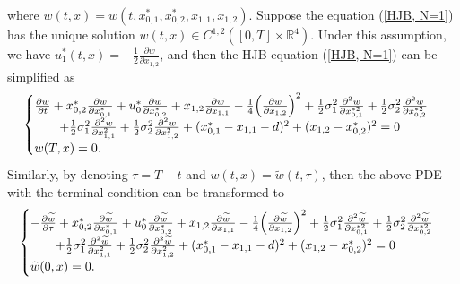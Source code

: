 \documentclass{article}
\begin{document}
where $w(t, x) = w(t, x_{0, 1}^{*}, x_{0, 2}^{*}, x_{1, 1}, x_{1, 2})$. Suppose the equation (\ref{HJB, N=1}) has the unique solution $w(t,x) \in C^{1,2}([0, T] \times \mathbb{R}^{4})$. Under this assumption, we have $u_{1}^{*}(t, x) = - \frac{1}{2} \frac{\partial w}{\partial x_{1, 2}}$, and then the HJB equation (\ref{HJB, N=1}) can be simplified as
\begin{equation*}
    \begin{cases}
    \frac{\partial w}{\partial t} + x_{0,2}^{*} \frac{\partial w}{\partial x_{0, 1}^{*}} + u_{0}^{*} \frac{\partial w}{\partial x_{0, 2}^{*}} + x_{1,2} \frac{\partial w}{\partial x_{1, 1}} - \frac{1}{4} \Big{(}\frac{\partial w}{\partial x_{1, 2}} \Big{)}^{2} + \frac{1}{2} \sigma_{1}^{2} \frac{\partial^{2} w}{\partial x_{0, 1}^{* 2}} + \frac{1}{2} \sigma_{2}^{2} \frac{\partial^{2} w}{\partial x_{0, 2}^{* 2}}  \\
   \qquad + \frac{1}{2} \sigma_{1}^{2} \frac{\partial^{2} w}{\partial x_{1, 1}^{2}} + \frac{1}{2} \sigma_{2}^{2} \frac{\partial^{2} w}{\partial x_{1, 2}^{2}} + (x_{0, 1}^{*} - x_{1, 1} - d)^{2} + (x_{1, 2} - x_{0, 2}^{*})^{2}  = 0  \\
   w(T, x) = 0.
   \end{cases}
\end{equation*}
Similarly, by denoting $\tau = T-t$ and $w(t,x) = \widetilde{w}(t, \tau)$, then the above PDE with the terminal condition can be transformed to
\begin{equation*}
    \begin{cases}
    - \frac{\partial \widetilde{w}}{\partial \tau} + x_{0,2}^{*} \frac{\partial \widetilde{w}}{\partial x_{0, 1}^{*}} + u_{0}^{*} \frac{\partial \widetilde{w}}{\partial x_{0, 2}^{*}} + x_{1,2} \frac{\partial \widetilde{w}}{\partial x_{1, 1}} - \frac{1}{4} \Big{(}\frac{\partial \widetilde{w}}{\partial x_{1, 2}} \Big{)}^{2} + \frac{1}{2} \sigma_{1}^{2} \frac{\partial^{2} \widetilde{w}}{\partial x_{0, 1}^{* 2}} + \frac{1}{2} \sigma_{2}^{2} \frac{\partial^{2} \widetilde{w}}{\partial x_{0, 2}^{* 2}}  \\
   \qquad + \frac{1}{2} \sigma_{1}^{2} \frac{\partial^{2} \widetilde{w}}{\partial x_{1, 1}^{2}} + \frac{1}{2} \sigma_{2}^{2} \frac{\partial^{2} \widetilde{w}}{\partial x_{1, 2}^{2}} + (x_{0, 1}^{*} - x_{1, 1} - d)^{2} + (x_{1, 2} - x_{0, 2}^{*})^{2}  = 0  \\
   \widetilde{w}(0, x) = 0.
   \end{cases}
\end{equation*}
\end{document}
